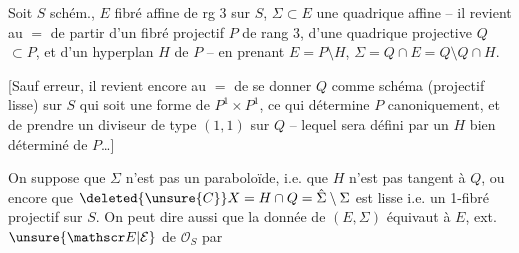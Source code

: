

Soit $S$ schém., $E$ fibré affine de rg 3 sur $S$, $\Sigma\subset E$ une quadrique affine  -- il revient au $=$ de partir d'un fibré projectif  $P$ de rang 3, d'une quadrique projective  $Q$\inserted{$(=\hat\Sigma)$}$\subset P$, et d'un hyperplan $H$ de $P$ -- en prenant $E=P\setminus H$, $\Sigma=Q\cap E=Q\setminus Q\cap H$. 

[Sauf erreur, il revient encore au $=$ de se donner $Q$ comme schéma (projectif lisse) sur $S$ qui soit une forme de $P^1\times P^1$, ce qui détermine $P$ canoniquement, et de prendre un diviseur  de type $(1,1)$ sur $Q$ -- lequel sera défini par un $H$ bien déterminé de $P$\ldots]

On suppose que $\Sigma$ n'est pas un paraboloïde,  i.e. que $H$ n'est pas tangent à $Q$, ou encore que $\deleted{\unsure{C}}X=H\cap Q=\hat\Sigma\setminus\Sigma$ est lisse i.e. un 1-fibré projectif sur $S$. On peut dire aussi que la donnée de $(E,\Sigma)$ équivaut à $E$,  ext. $\unsure{\mathscr E|\mathcal E}$ de $\mathcal O_S$ par

